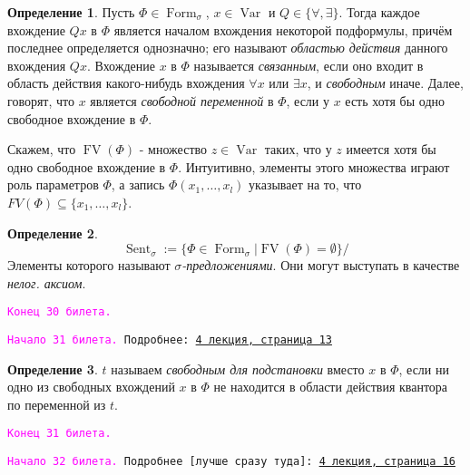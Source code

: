 \documentclass[a4paper,100pt]{article}
\theoremstyle{indented}
\theoremstyle{definition}
\newtheorem{defn}{Определение}
\theoremstyle{remark}
\DeclareMathOperator{\form}{Form}
\DeclareMathOperator{\Var}{Var}
\DeclareMathOperator{\FV}{FV}
\DeclareMathOperator{\Sent}{Sent}
\begin{document}
\begin{defn}
  Пусть $\Phi \in \form_\sigma$, $x\in \Var$ и $Q\in \{\forall, \exists\}$. Тогда каждое вхождение $Qx$ в $\Phi$ является началом вхождения некоторой подформулы, причём последнее определяется однозначно; его называют \textit{областью действия} данного вхождения $Qx$. Вхождение $x$ в $\Phi$ называется \textit{связанным}, если оно входит в область действия какого-нибудь вхождения $\forall x$ или $\exists x$, и \textit{свободным} иначе. Далее, говорят, что $x$ является \textit{свободной переменной} в $\Phi$, если у $x$ есть хотя бы одно свободное вхождение в $\Phi$. \ 

  Скажем, что $\FV(\Phi)$ - множество $z\in \Var$ таких, что у $z$ имеется хотя бы одно свободное вхождение в $\Phi$. Интуитивно, элементы этого множества играют роль параметров $\Phi$, а запись $\Phi(x_1, \ldots, x_l)$ указывает на то, что $FV(\Phi)\subseteq \{x_1, \ldots, x_l\}$. 
\end{defn}

\begin{defn}
  \[
    \Sent_\sigma := \{\Phi \in \form_\sigma | \FV (\Phi)=\emptyset\}/ 
  \]
  Элементы которого называют \textit{$\sigma$-предложениями}. Они могут выступать в качестве \textit{нелог. аксиом}.
\end{defn}

\texttt{\textcolor{magenta}{Конец 30 билета.}} 

\hrulefill

\texttt{\hypertarget{b31}{\textcolor{magenta}{Начало 31 билета.}} Подробнее: \href{http://www.mi-ras.ru/~speranski/courses/logic-1-2021-spring/slides_4.pdf}{4 лекция, страница 13}} 

\begin{defn}
  $t$ называем \textit{свободным для подстановки} вместо $x$ в $\Phi$, если ни одно из свободных вхождений $x$ в $\Phi$ не находится в области действия квантора по переменной из $t$. 
\end{defn}

\texttt{\textcolor{magenta}{Конец 31 билета.}} 

\hrulefill

\texttt{\hypertarget{b32}{\textcolor{magenta}{Начало 32 билета.}} Подробнее [лучше сразу туда]: \href{http://www.mi-ras.ru/~speranski/courses/logic-1-2021-spring/slides_4.pdf}{4 лекция, страница 16}} 
\end{document}
